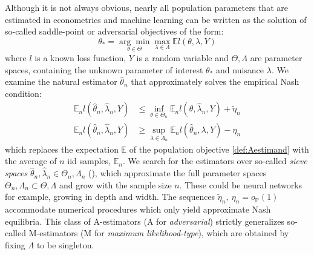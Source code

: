 \documentclass[12pt]{article}
\theoremstyle{myplain}
\theoremstyle{definition}
\theoremstyle{definition}
\theoremstyle{remark}
\numberwithin{equation}{section}
\begin{document}
Although it is not always obvious, nearly all population parameters that are estimated in econometrics and machine learning can be written as the solution of so-called saddle-point or adversarial objectives of the form:
\begin{equation}
\label{def:Aestimand}
    \theta_* = \underset{\theta \in \Theta}{\arg\min} \max_{\lambda\in\Lambda} \mathbb{E} l(\theta, \lambda, Y)
\end{equation}
where $l$ is a known loss function, $Y$ is a random variable and $\Theta, \Lambda$ are parameter spaces, containing the unknown parameter of interest $\theta_*$ and nuisance $\lambda$. We examine the natural estimator $\widehat\theta_n$ that approximately solves the empirical Nash condition:
% 
\begin{align}
    \label{assn:outernash}\mathbb{E}_n l(\widehat\theta_n, \widehat\lambda_n, Y) & \leq \inf_{\theta\in\Theta_n} \mathbb{E}_n l(\theta, \widehat\lambda_n, Y) + \widetilde\eta_n  \\
    \label{assn:innernash}\mathbb{E}_n l(\widehat\theta_n, \widehat\lambda_n, Y) & \geq \sup_{\lambda\in\Lambda_n} \mathbb{E}_n l(\widehat\theta_n, \lambda, Y) - \eta_n
\end{align}
which replaces the expectation $\mathbb{E}$ of the population objective \ref{def:Aestimand} with the average of $n$ iid samples, $\mathbb{E}_n$. We search for the estimators over so-called {\it sieve spaces}  $\widehat\theta_n,\widehat\lambda_n\in\Theta_n,\Lambda_n$ (\cite{grenander1981abstract}), which approximate the full parameter spaces $\Theta_n,\Lambda_n\subset\Theta,\Lambda$ and grow with the sample size $n$. These could be neural networks for example, growing in depth and width. The sequences $\widetilde \eta_n,\ \eta_n=o_\mathbb{P}(1)$ accommodate numerical procedures which only yield approximate Nash equilibria. This class of A-estimators (A for {\it adversarial}) strictly generalizes so-called M-estimators (M for {\it maximum likelihood-type}), which are obtained by fixing $\Lambda$ to be singleton.\\
\end{document}
